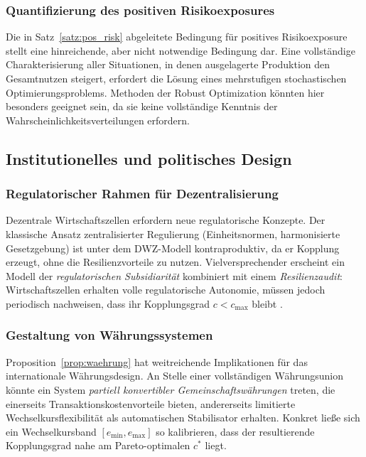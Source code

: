 ﻿\documentclass[a4paper,12pt]{article}
\theoremstyle{definition}
\begin{document}
\subsubsection{Quantifizierung des positiven Risikoexposures}

Die in Satz~\ref{satz:pos_risk} abgeleitete Bedingung für positives Risikoexposure stellt
eine hinreichende, aber nicht notwendige Bedingung dar. Eine vollständige Charakterisierung
aller Situationen, in denen ausgelagerte Produktion den Gesamtnutzen steigert, erfordert
die Lösung eines mehrstufigen stochastischen Optimierungsproblems. Methoden der Robust
Optimization \citep{ben2009robust} könnten hier besonders geeignet sein, da sie keine
vollständige Kenntnis der Wahrscheinlichkeitsverteilungen erfordern.

\subsection{Institutionelles und politisches Design}

\subsubsection{Regulatorischer Rahmen für Dezentralisierung}

Dezentrale Wirtschaftszellen erfordern neue regulatorische Konzepte. Der klassische
Ansatz zentralisierter Regulierung (Einheitsnormen, harmonisierte Gesetzgebung) ist
unter dem DWZ-Modell kontraproduktiv, da er Kopplung erzeugt, ohne die Resilienzvorteile
zu nutzen. Vielversprechender erscheint ein Modell der \emph{regulatorischen Subsidiarität}
kombiniert mit einem \emph{Resilienzaudit}: Wirtschaftszellen erhalten volle regulatorische
Autonomie, müssen jedoch periodisch nachweisen, dass ihr Kopplungsgrad $c < c_{\text{max}}$
bleibt \citep{ostrom1990governing}.

\subsubsection{Gestaltung von Währungssystemen}

Proposition~\ref{prop:waehrung} hat weitreichende Implikationen für das internationale
Währungsdesign. An Stelle einer vollständigen Währungsunion könnte ein System \emph{partiell
konvertibler Gemeinschaftswährungen} treten, die einerseits Transaktionskostenvorteile
bieten, andererseits limitierte Wechselkursflexibilität als automatischen Stabilisator
erhalten. Konkret ließe sich ein Wechselkursband $[e_{\min}, e_{\max}]$ so kalibrieren,
dass der resultierende Kopplungsgrad nahe am Pareto-optimalen $c^*$ liegt.
\end{document}
